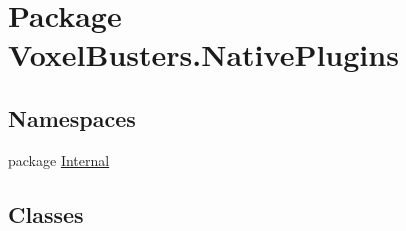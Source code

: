 \hypertarget{namespace_voxel_busters_1_1_native_plugins}{}\section{Package Voxel\+Busters.\+Native\+Plugins}
\label{namespace_voxel_busters_1_1_native_plugins}
\subsection*{Namespaces}
\begin{DoxyCompactItemize}
\item 
package \hyperlink{namespace_voxel_busters_1_1_native_plugins_1_1_internal}{Internal}
\end{DoxyCompactItemize}
\subsection*{Classes}
